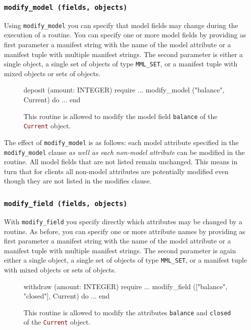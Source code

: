 \documentclass[a4paper,12pt]{article}
\newcommand{\e}[1]{\mbox{\lstinline[language=Eiffel]|#1|}}
\begin{document}
\subsubsection*{\e{modify_model (fields, objects)}}

Using \e{modify_model} you can specify that model fields may change during the execution of a routine. You can specify one or more model fields by providing as first parameter a manifest string with the name of the model attribute or a manifest tuple with multiple manifest strings. The second parameter is either a single object, a single set of objects of type \e{MML_SET}, or a manifest tuple with mixed objects or sets of objects.

\begin{figure}
\begin{erunning}
deposit (amount: INTEGER)
	require
		...
		modify_model ("balance", Current)
	do ... end
\end{erunning}
\hspace{0.5cm}
\caption*{This routine is allowed to modify the model field \e{balance} of the \e{Current} object.}
\end{figure}

The effect of \e{modify_model} is as follows: each model attribute specified in the \e{modify_model} clause \emph{as well as each non-model attribute} can be modified in the routine. All model fields that are not listed remain unchanged. This means in turn that for clients all non-model attributes are potentially modified even though they are not listed in the modifies clause.

\subsubsection*{\e{modify_field (fields, objects)}}

With \e{modify_field} you specify directly which attributes may be changed by a routine. As before,
you can specify one or more attribute names by providing as first parameter a manifest string with the name of the model attribute or a manifest tuple with multiple manifest strings. The second parameter is again either a single object, a single set of objects of type \e{MML_SET}, or a manifest tuple with mixed objects or sets of objects.

\begin{figure}
\begin{erunning}
withdraw (amount: INTEGER)
	require
		...
		modify_field (["balance", "closed"], Current)
	do ... end
\end{erunning}
\hspace{0.5cm}
\caption*{This routine is allowed to modify the attributes \e{balance} and \e{closed} of the \e{Current} object.}
\end{figure}
\end{document}
